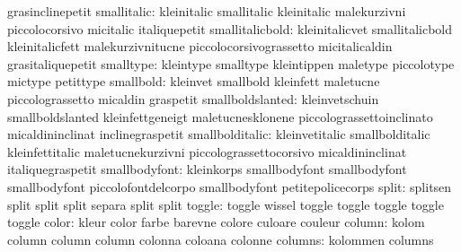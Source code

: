                            grasinclinepetit
              smallitalic: kleinitalic               smallitalic
                           kleinitalic               malekurzivni
                           piccolocorsivo            micitalic
                           italiquepetit
          smallitalicbold: kleinitalicvet            smallitalicbold
                           kleinitalicfett           malekurzivnitucne
                           piccolocorsivograssetto   micitalicaldin
                           grasitaliquepetit
                smalltype: kleintype                 smalltype
                           kleintippen               maletype
                           piccolotype               mictype
                           petittype
                smallbold: kleinvet                  smallbold
                           kleinfett                 maletucne
                           piccolograssetto          micaldin
                           graspetit
         smallboldslanted: kleinvetschuin            smallboldslanted
                           kleinfettgeneigt          maletucnesklonene
                           piccolograssettoinclinato micaldininclinat
                           inclinegraspetit
          smallbolditalic: kleinvetitalic            smallbolditalic
                           kleinfettitalic           maletucnekurzivni
                           piccolograssettocorsivo   micaldininclinat
                           italiquegraspetit
            smallbodyfont: kleinkorps                smallbodyfont
                           smallbodyfont             smallbodyfont
                           piccolofontdelcorpo       smallbodyfont
                           petitepolicecorps
                    split: splitsen                  split
                           split                     split
                           separa                    split
                           split
                   toggle: toggle                    wissel
                           toggle                    toggle
                           toggle                    toggle
                           toggle
                    color: kleur                     color
                           farbe                     barevne
                           colore                    culoare
                           couleur
                   column: kolom                     column
                           column                    column
                           colonna                   coloana
                           colonne
                  columns: kolommen                  columns
